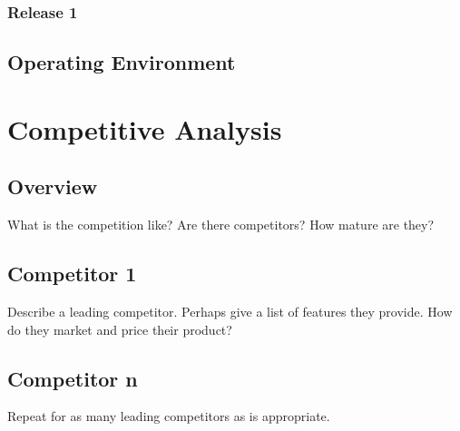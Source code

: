 \documentclass[12pt,oneside,letterpaper]{article}
\begin{document}
\subsubsection{Release 1}
\subsection{Operating Environment}

\section{Competitive Analysis}
\subsection{Overview}
What is the competition like?  Are there competitors?  How mature are they?  
\subsection{Competitor 1}
Describe a leading competitor.  Perhaps give a list of features they provide.  How do they market and price their product?
\subsection{Competitor n}
Repeat for as many leading competitors as is appropriate.
\end{document}
